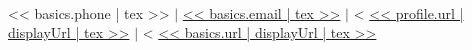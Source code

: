 \begin{center}
  \textbf{\huge \color{maincolor}{<< basics.name | tex >>}} \\ \vspace{2pt}
  \small << basics.phone | tex >> $|$
  \href{mailto:<< basics.email | url >>}{<< basics.email | tex >>} $|$
<%
  \href{<< profile.url | url >>}{<< profile.url | displayUrl | tex >>} $|$
<%
  \href{<< basics.url | url >>}{<< basics.url | displayUrl | tex >>}
\end{center}


